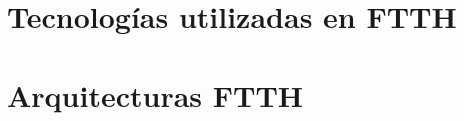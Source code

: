  \section{Tecnologías utilizadas en FTTH}
 \resetallcounters
 
 \clearpage

 \section{Arquitecturas FTTH}
 \resetallcounters
 
 \clearpage

